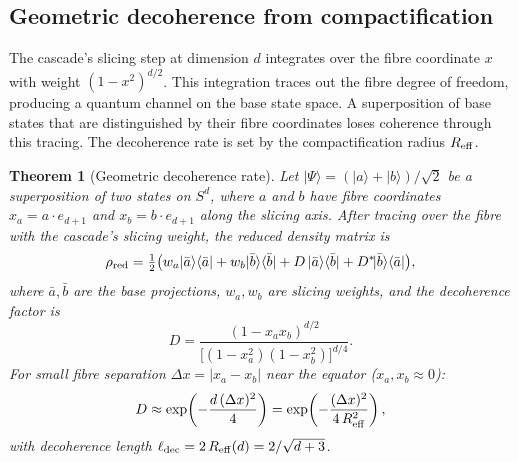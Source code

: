 \documentclass[12pt,a4paper]{article}
\newtheorem{theorem}{Theorem}[section]
\begin{document}
\subsection{Geometric decoherence from compactification}

The cascade's slicing step at dimension $d$ integrates over the fibre coordinate $x$ with
weight $(1-x^2)^{d/2}$. This integration traces out the fibre degree of freedom, producing
a quantum channel on the base state space. A superposition of base states that are
distinguished by their fibre coordinates loses coherence through this tracing. The
decoherence rate is set by the compactification radius $R_{\rm eff}$.

\begin{theorem}[Geometric decoherence rate]\label{thm:decoherence}
Let $|\Psi\rangle = (|a\rangle + |b\rangle)/\sqrt{2}$ be a superposition of two states on
$S^d$, where $a$ and $b$ have fibre coordinates $x_a = a\cdot e_{d+1}$ and
$x_b = b\cdot e_{d+1}$ along the slicing axis. After tracing over the fibre with the
cascade's slicing weight, the reduced density matrix is
\[
\rho_{\rm red} = \tfrac{1}{2}\bigl(w_a|\bar{a}\rangle\langle\bar{a}|
+ w_b|\bar{b}\rangle\langle\bar{b}|
+ D\,|\bar{a}\rangle\langle\bar{b}|
+ D^*\!|\bar{b}\rangle\langle\bar{a}|\bigr),
\]
where $\bar{a},\bar{b}$ are the base projections, $w_a,w_b$ are slicing weights, and the
decoherence factor is
\begin{equation}\label{eq:decoherence}
D = \frac{(1-x_a x_b)^{d/2}}{\bigl[(1-x_a^2)(1-x_b^2)\bigr]^{d/4}}.
\end{equation}
For small fibre separation $\Delta x = |x_a - x_b|$ near the equator ($x_a,x_b\approx 0$):
\begin{equation}\label{eq:decoherence-gaussian}
D \approx \exp\!\left(-\frac{d\,(\Delta x)^2}{4}\right)
= \exp\!\left(-\frac{(\Delta x)^2}{4\,R_{\rm eff}^2}\right),
\end{equation}
with decoherence length $\ell_{\rm dec} = 2\,R_{\rm eff}(d) = 2/\sqrt{d+3}$.
\end{theorem}
\end{document}
